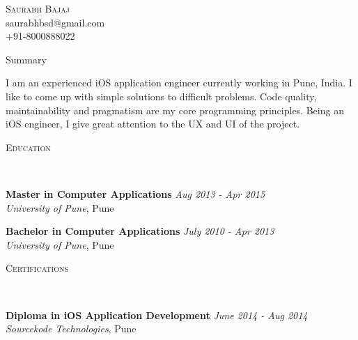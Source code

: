 \documentclass[9pt]{article}
\newenvironment{changemargin}[2]{%
  \begin{list}{}{%
    \setlength{\topsep}{0pt}%
    \setlength{\leftmargin}{#1}%
    \setlength{\rightmargin}{#2}%
    \setlength{\listparindent}{\parindent}%
    \setlength{\itemindent}{\parindent}%
    \setlength{\parsep}{\parskip}%
  }%
  \item[]}{\end{list}
}
\newcommand{\lineover}{
    \begin{changemargin}{-0.05in}{-0.05in}
        \vspace*{-8pt}
        \hrulefill \\
        \vspace*{-2pt}
    \end{changemargin}
}
\newcommand{\header}[1]{
    \begin{changemargin}{-0.5in}{-0.5in}
        \scshape{#1}\\
    \lineover
    \end{changemargin}
}
\newcommand{\contact}[4]{
    \begin{changemargin}{-0.5in}{-0.5in}
        \begin{center}
            {\Large \scshape {#1}}\\ \smallskip
            {#2}\\ \smallskip
            {#3}\\ \smallskip
            {#4}\smallskip
        \end{center}
    \end{changemargin}
}
\newenvironment{body} {
    \vspace*{-16pt}
    \begin{changemargin}{-0.25in}{-0.5in}
  }
    {\end{changemargin}
}
\begin{document}
\contact{Saurabh Bajaj}{saurabhbsd@gmail.com}{+91-8000888022}


\header{Summary}

\begin{body}
    \vspace{14pt}
  I am an experienced iOS application engineer currently working in Pune, India. I like to come up with simple solutions to difficult problems. Code quality, maintainability and pragmatism are my core programming principles. Being an iOS engineer, I give great attention to the UX and UI of the project.

\end{body}

\smallskip


\header{Education}

\begin{body}
    \vspace{14pt}
    \textbf{Master in Computer Applications}{} \hfill \emph{Aug 2013 - Apr 2015}{} \\
    \emph{University of Pune}, Pune{} \\
\end{body}

\begin{body}
    \vspace{14pt}
    \textbf{Bachelor in Computer Applications}{} \hfill \emph{July 2010 - Apr 2013}{} \\
    \emph{University of Pune}, Pune{} \\
\end{body}

\smallskip


\header{Certifications}

\begin{body}
    \vspace{14pt}
    \textbf{Diploma in iOS Application Development}{} \hfill \emph{June 2014 - Aug 2014}{} \\
    \emph{Sourcekode Technologies}, Pune{} \\
\end{body}

\smallskip
\end{document}
